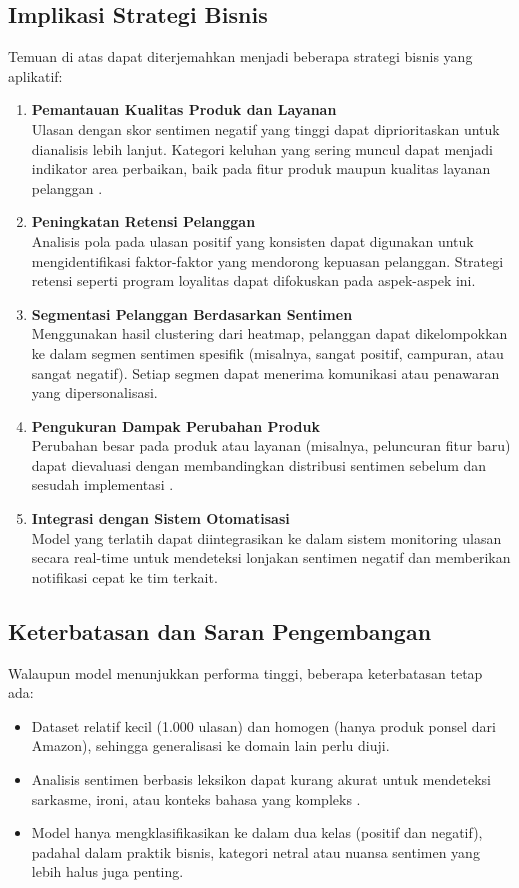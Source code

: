 \subsection*{Implikasi Strategi Bisnis}
Temuan di atas dapat diterjemahkan menjadi beberapa strategi bisnis yang aplikatif:
\begin{enumerate}
	\item \textbf{Pemantauan Kualitas Produk dan Layanan} \\
	Ulasan dengan skor sentimen negatif yang tinggi dapat diprioritaskan untuk dianalisis lebih lanjut. Kategori keluhan yang sering muncul dapat menjadi indikator area perbaikan, baik pada fitur produk maupun kualitas layanan pelanggan \cite{medhat2014sentiment}.
	\item \textbf{Peningkatan Retensi Pelanggan} \\
	Analisis pola pada ulasan positif yang konsisten dapat digunakan untuk mengidentifikasi faktor-faktor yang mendorong kepuasan pelanggan. Strategi retensi seperti program loyalitas dapat difokuskan pada aspek-aspek ini.
	\item \textbf{Segmentasi Pelanggan Berdasarkan Sentimen} \\
	Menggunakan hasil clustering dari heatmap, pelanggan dapat dikelompokkan ke dalam segmen sentimen spesifik (misalnya, sangat positif, campuran, atau sangat negatif). Setiap segmen dapat menerima komunikasi atau penawaran yang dipersonalisasi.
	\item \textbf{Pengukuran Dampak Perubahan Produk} \\
	Perubahan besar pada produk atau layanan (misalnya, peluncuran fitur baru) dapat dievaluasi dengan membandingkan distribusi sentimen sebelum dan sesudah implementasi \cite{liu2012sentiment}.
	\item \textbf{Integrasi dengan Sistem Otomatisasi} \\
	Model yang terlatih dapat diintegrasikan ke dalam sistem monitoring ulasan secara real-time untuk mendeteksi lonjakan sentimen negatif dan memberikan notifikasi cepat ke tim terkait.
\end{enumerate}

\subsection*{Keterbatasan dan Saran Pengembangan}
Walaupun model menunjukkan performa tinggi, beberapa keterbatasan tetap ada:
\begin{itemize}
	\item Dataset relatif kecil (1.000 ulasan) dan homogen (hanya produk ponsel dari Amazon), sehingga generalisasi ke domain lain perlu diuji.
	\item Analisis sentimen berbasis leksikon dapat kurang akurat untuk mendeteksi sarkasme, ironi, atau konteks bahasa yang kompleks \cite{pang2008opinion}.
	\item Model hanya mengklasifikasikan ke dalam dua kelas (positif dan negatif), padahal dalam praktik bisnis, kategori netral atau nuansa sentimen yang lebih halus juga penting.
\end{itemize}

